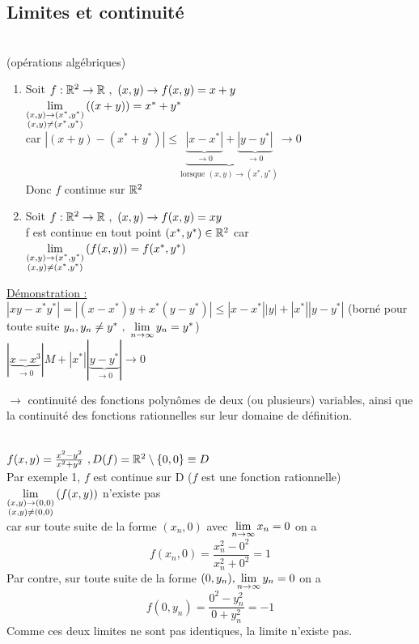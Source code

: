 \documentclass[12pt,a4paper]{article}
\begin{document}
\subsection{Limites et continuité}
\\
 (opérations algébriques)
\begin{enumerate}
\item  Soit $f : \mathbb{R}^2 \to \mathbb{R} \ , \ (x,y) \to f(x,y) = x+y$\\
$\lim\limits_{\substack{(x,y) \to (x^*,y^*) \\ (x,y) \neq (x^*,y^*)}}\left((x+y)\right) = x^* + y^*$\\
car $|(x+y) - (x^*+y^*)| \leq \underbrace{\underbrace{|x-x^*|}_{\to 0} + \underbrace{|y-y^*|}_{\to 0}}_{\text{lorsque } (x,y) \to (x^*,y^*)} \to 0$\\
Donc $f$ continue sur $\mathbb{R}^2$
\item Soit $f: \mathbb{R}^2 \to \mathbb{R} \ , \ (x,y) \to f(x,y) = xy$\\
f est continue en tout point $(x^*,y^*) \in \mathbb{R}^2$ car\\
$\lim\limits_{\substack{(x,y) \to (x^*,y^*) \\ (x,y) \neq (x^*,y^*)}}\left(f(x,y)\right) = f(x^*,y^*)$
\end{enumerate}
\underline{Démonstration :} $|xy - x^*y^*| = |(x-x^*)y + x^*(y-y^*)| \leq |x-x^*||y| +|x^*||y-y^*|$ (borné pour toute suite $y_n, y_n\neq y^* \ , \ \lim\limits_{n \to \infty} y_n = y^*$)\\
 $|\underbrace{x-x^3}_{\to 0}| M + |x^*||\underbrace{y-y^*}_{\to 0}| \to 0$\\
 \begin{boite}
	$\to$ continuité des fonctions polynômes de deux (ou plusieurs) variables, ainsi que la continuité des fonctions rationnelles sur leur domaine de définition.	
\end{boite}

\\
$f(x,y) = \frac{x^2-y^2}{x^2+y^2} \ , D(f) = \mathbb{R}^2\setminus \{0,0\} \equiv D$\\
Par exemple 1, $f$ est continue sur D ($f$ est une fonction rationnelle)\\
$\lim\limits_{\substack{(x,y) \to (0,0) \\ (x,y) \neq (0,0)}}\left(f(x,y)\right)$ n'existe pas\\
car sur toute suite de la forme $(x_n, 0)$ avec $\lim\limits_{n \to \infty} x_n = 0$ on a 
\begin{equation*}
f(x_n, 0) = \frac{x_n^2 - 0^2}{x_n^2+0^2} = 1
\end{equation*}
Par contre, sur toute suite de la forme $(0,y_n),\lim\limits_{n \to \infty}y_n = 0$ on a 
\begin{equation*}
	f(0,y_n) = \frac{0^2-y_n^2}{0+y_n^2} = -1
\end{equation*}
Comme ces deux limites ne sont pas identiques, la limite n'existe pas.
\end{document}
